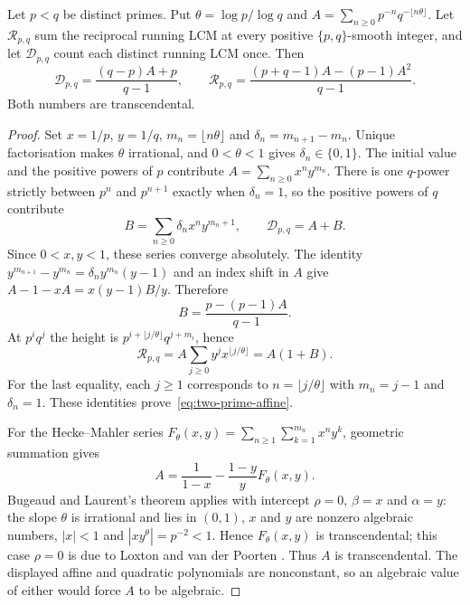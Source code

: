 \documentclass[11pt]{article}
\begin{document}
\begin{theorem}
\label{res:two-prime-transcendence}
\label{res:two-prime-repeated-transcendence}
Let $p<q$ be distinct primes.  Put $\theta=\log p/\log q$ and
$A=\sum_{n\ge0}p^{-n}q^{-\lfloor n\theta\rfloor}$.  Let
$\mathcal R_{p,q}$ sum the reciprocal running LCM at every positive
$\{p,q\}$-smooth integer, and let $\mathcal D_{p,q}$ count each distinct
running LCM once.  Then
\begin{equation}\label{eq:two-prime-affine}
 \mathcal D_{p,q}=\frac{(q-p)A+p}{q-1},\qquad
 \mathcal R_{p,q}=\frac{(p+q-1)A-(p-1)A^2}{q-1}.
\end{equation}
Both numbers are transcendental.
\end{theorem}
\begin{proof}
Set $x=1/p$, $y=1/q$, $m_n=\lfloor n\theta\rfloor$ and
$\delta_n=m_{n+1}-m_n$.  Unique factorisation makes $\theta$ irrational,
and $0<\theta<1$ gives $\delta_n\in\{0,1\}$.  The initial value and the
positive powers of $p$ contribute $A=\sum_{n\ge0}x^ny^{m_n}$.  There is
one $q$-power strictly between $p^n$ and $p^{n+1}$ exactly when
$\delta_n=1$, so the positive powers of $q$ contribute
\[
 B=\sum_{n\ge0}\delta_nx^ny^{m_n+1},\qquad \mathcal D_{p,q}=A+B.
\]
Since $0<x,y<1$, these series converge absolutely.  The identity
$y^{m_{n+1}}-y^{m_n}=\delta_ny^{m_n}(y-1)$ and an index shift in $A$
give $A-1-xA=x(y-1)B/y$.  Therefore
\[
 B=\frac{p-(p-1)A}{q-1}.
\]
At $p^iq^j$ the height is
$p^{i+\lfloor j/\theta\rfloor}q^{j+m_i}$, hence
\[
 \mathcal R_{p,q}
 =A\sum_{j\ge0}y^jx^{\lfloor j/\theta\rfloor}=A(1+B).
\]
For the last equality, each $j\ge1$ corresponds to
$n=\lfloor j/\theta\rfloor$ with $m_n=j-1$ and $\delta_n=1$.
These identities prove~\eqref{eq:two-prime-affine}.

For the Hecke--Mahler series
$F_\theta(x,y)=\sum_{n\ge1}\sum_{k=1}^{m_n}x^ny^k$, geometric summation gives
\begin{equation}\label{eq:hecke-mahler-boundary}
 A=\frac1{1-x}-\frac{1-y}{y}F_\theta(x,y).
\end{equation}
Bugeaud and Laurent's theorem \cite[Theorem~1.1]{bugeaudlaurent2023} applies
with intercept $\rho=0$, $\beta=x$ and $\alpha=y$: the slope $\theta$ is
irrational and lies in $(0,1)$, $x$ and $y$ are nonzero algebraic numbers,
$|x|<1$ and $|xy^\theta|=p^{-2}<1$.  Hence $F_\theta(x,y)$ is transcendental;
this case $\rho=0$ is due to Loxton and van der Poorten
\cite[Theorem~8, p.~40]{loxtonvdp1977}.  Thus $A$ is transcendental.
The displayed affine and quadratic polynomials are nonconstant, so an
algebraic value of either would force $A$ to be algebraic.
\end{proof}
\end{document}
